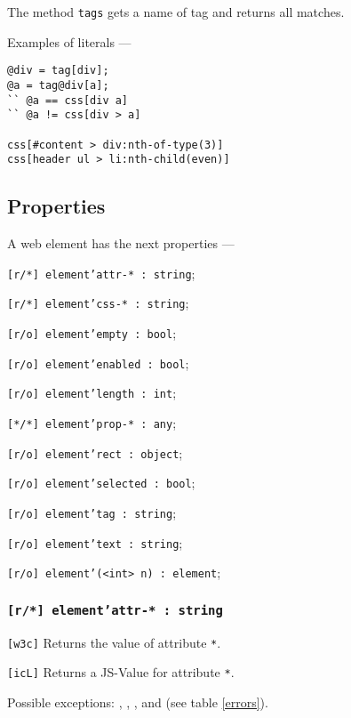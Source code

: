 The method \texttt{tags} gets a name of tag and returns all matches. 

Examples of literals —
\begin{verbatim}
@div = tag[div];
@a = tag@div[a];
`` @a == css[div a]
`` @a != css[div > a]

css[#content > div:nth-of-type(3)]
css[header ul > li:nth-child(even)]
\end{verbatim}

\subsection{Properties}

A web element has the next properties —
\begin{icItems}
\item \texttt{[r/*] element'attr-* : string};
\item \texttt{[r/*] element'css-* : string};
\item \texttt{[r/o] element'empty : bool};
\item \texttt{[r/o] element'enabled : bool};
\item \texttt{[r/o] element'length : int};
\item \texttt{[*/*] element'prop-* : any};
\item \texttt{[r/o] element'rect : object};
\item \texttt{[r/o] element'selected : bool};
\item \texttt{[r/o] element'tag : string};
\item \texttt{[r/o] element'text : string};
\item \texttt{[r/o] element'(<int> n) : element};
\end{icItems} 

\subsubsection{\texttt{[r/*] element'attr-* : string}}

\texttt{[w3c]} Returns the value of attribute \texttt{*}.

\texttt{[icL]} Returns a JS-Value for attribute \texttt{*}.

Possible exceptions: , , ,  and  (see table \ref{errors}).

